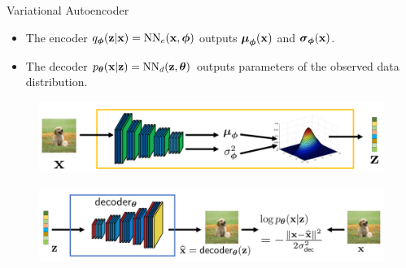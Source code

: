 \documentclass{beamer}
\begin{document}
\begin{frame}{Variational Autoencoder}
	\begin{itemize}
		\item The encoder $q_{\boldsymbol{\phi}}(\mathbf{z}| \mathbf{x}) = \text{NN}_e(\mathbf{x}, \boldsymbol{\phi})$ outputs $\boldsymbol{\mu}_{\boldsymbol{\phi}}(\mathbf{x})$ and $\boldsymbol{\sigma}_{\boldsymbol{\phi}}(\mathbf{x})$.
		\item The decoder $p_{\boldsymbol{\theta}}(\mathbf{x} | \mathbf{z}) = \text{NN}_d(\mathbf{z}, \boldsymbol{\theta})$ outputs parameters of the observed data distribution.
	\end{itemize}
	\begin{figure}[h]
		\centering
		\includegraphics[width=0.7\linewidth]{figs/vae-encoder}
	\end{figure}
	\begin{figure}[h]
		\centering
		\includegraphics[width=0.9\linewidth]{figs/vae-decoder}
	\end{figure}
\end{frame}
\end{document}
